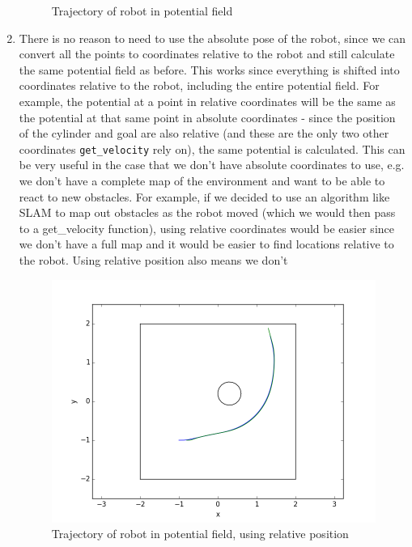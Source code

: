 \documentclass[12pt,a4paper]{article}
\begin{document}
\begin{enumerate}[label=(\alph*)]
\begin{figure}[!htb]
		\caption{Trajectory of robot in potential field}
		\label{fig:trajectory}
	\end{figure}
	\item There is no reason to need to use the absolute pose of the robot, since we can convert all the points to coordinates relative to the robot and still calculate the same potential field as before. This works since everything is shifted into coordinates relative to the robot, including the entire potential field. For example, the potential at a point in relative coordinates will be the same as the potential at that same point in absolute coordinates - since the position of the cylinder and goal are also relative (and these are the only two other coordinates \texttt{get\_velocity} rely on), the same potential is calculated. This can be very useful in the case that we don't have absolute coordinates to use, e.g. we don't have a complete map of the environment and want to be able to react to new obstacles. For example, if we decided to use an algorithm like SLAM to map out obstacles as the robot moved (which we would then pass to a get\_velocity function), using relative coordinates would be easier since we don't have a full map and it would be easier to find locations relative to the robot. Using relative position also means we don't 
	\begin{figure}[!htb]
		\centering
		\includegraphics[width=\textwidth]{fig/2d.png}
		\caption{Trajectory of robot in potential field, using relative position}
		\label{fig:trajectory}
	\end{figure}

\end{enumerate}
\end{document}
